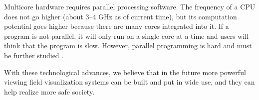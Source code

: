 Multicore hardware requires parallel processing software. The frequency of a CPU does not go higher (about 3--4 GHz as of current time), but its computation potential goes higher because there are many cores integrated into it. If a program is not parallel, it will only run on a single core at a time and users will think that the program is slow. However, parallel programming is hard and must be further studied \cite{Reference17}.

With these technological advances, we believe that in the future more powerful viewing field visualization systems can be built and put in wide use, and they can help realize more safe society.
